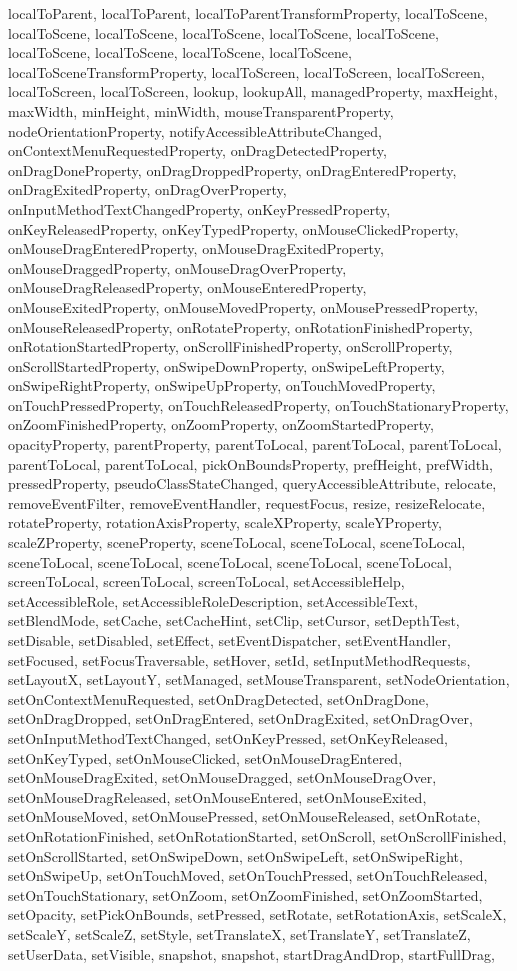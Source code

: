 {{{{{{{{{{{{{{localToParent, localToParent, localToParentTransformProperty, localToScene, localToScene, localToScene, localToScene, localToScene, localToScene, localToScene, localToScene, localToScene, localToScene, localToSceneTransformProperty, localToScreen, localToScreen, localToScreen, localToScreen, localToScreen, lookup, lookupAll, managedProperty, maxHeight, maxWidth, minHeight, minWidth, mouseTransparentProperty, nodeOrientationProperty, notifyAccessibleAttributeChanged, onContextMenuRequestedProperty, onDragDetectedProperty, onDragDoneProperty, onDragDroppedProperty, onDragEnteredProperty, onDragExitedProperty, onDragOverProperty, onInputMethodTextChangedProperty, onKeyPressedProperty, onKeyReleasedProperty, onKeyTypedProperty, onMouseClickedProperty, onMouseDragEnteredProperty, onMouseDragExitedProperty, onMouseDraggedProperty, onMouseDragOverProperty, onMouseDragReleasedProperty, onMouseEnteredProperty, onMouseExitedProperty, onMouseMovedProperty, onMousePressedProperty, onMouseReleasedProperty, onRotateProperty, onRotationFinishedProperty, onRotationStartedProperty, onScrollFinishedProperty, onScrollProperty, onScrollStartedProperty, onSwipeDownProperty, onSwipeLeftProperty, onSwipeRightProperty, onSwipeUpProperty, onTouchMovedProperty, onTouchPressedProperty, onTouchReleasedProperty, onTouchStationaryProperty, onZoomFinishedProperty, onZoomProperty, onZoomStartedProperty, opacityProperty, parentProperty, parentToLocal, parentToLocal, parentToLocal, parentToLocal, parentToLocal, pickOnBoundsProperty, prefHeight, prefWidth, pressedProperty, pseudoClassStateChanged, queryAccessibleAttribute, relocate, removeEventFilter, removeEventHandler, requestFocus, resize, resizeRelocate, rotateProperty, rotationAxisProperty, scaleXProperty, scaleYProperty, scaleZProperty, sceneProperty, sceneToLocal, sceneToLocal, sceneToLocal, sceneToLocal, sceneToLocal, sceneToLocal, sceneToLocal, sceneToLocal, screenToLocal, screenToLocal, screenToLocal, setAccessibleHelp, setAccessibleRole, setAccessibleRoleDescription, setAccessibleText, setBlendMode, setCache, setCacheHint, setClip, setCursor, setDepthTest, setDisable, setDisabled, setEffect, setEventDispatcher, setEventHandler, setFocused, setFocusTraversable, setHover, setId, setInputMethodRequests, setLayoutX, setLayoutY, setManaged, setMouseTransparent, setNodeOrientation, setOnContextMenuRequested, setOnDragDetected, setOnDragDone, setOnDragDropped, setOnDragEntered, setOnDragExited, setOnDragOver, setOnInputMethodTextChanged, setOnKeyPressed, setOnKeyReleased, setOnKeyTyped, setOnMouseClicked, setOnMouseDragEntered, setOnMouseDragExited, setOnMouseDragged, setOnMouseDragOver, setOnMouseDragReleased, setOnMouseEntered, setOnMouseExited, setOnMouseMoved, setOnMousePressed, setOnMouseReleased, setOnRotate, setOnRotationFinished, setOnRotationStarted, setOnScroll, setOnScrollFinished, setOnScrollStarted, setOnSwipeDown, setOnSwipeLeft, setOnSwipeRight, setOnSwipeUp, setOnTouchMoved, setOnTouchPressed, setOnTouchReleased, setOnTouchStationary, setOnZoom, setOnZoomFinished, setOnZoomStarted, setOpacity, setPickOnBounds, setPressed, setRotate, setRotationAxis, setScaleX, setScaleY, setScaleZ, setStyle, setTranslateX, setTranslateY, setTranslateZ, setUserData, setVisible, snapshot, snapshot, startDragAndDrop, startFullDrag, }}}}}}}}}}}}}}
